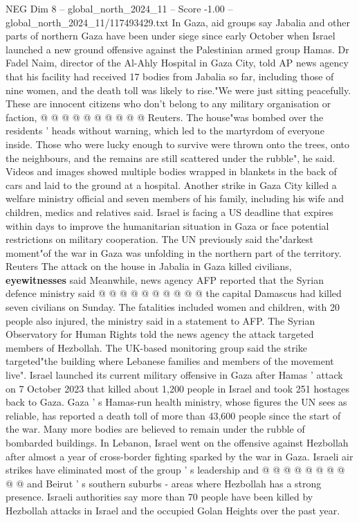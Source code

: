 \begin{textsample}{NEG Dim 8 – global\_north\_2024\_11 – Score -1.00 – global\_north\_2024\_11/117493429.txt}
In Gaza, aid groups say Jabalia and other parts of northern Gaza have been under siege since early October when Israel launched a new ground offensive against the Palestinian armed group Hamas.
Dr Fadel Naim, director of the Al-Ahly Hospital in Gaza City, told AP news agency that his facility had received 17 bodies from Jabalia so far, including those of nine women, and the death toll was likely to rise."We were just sitting peacefully.
These are innocent citizens who don't belong to any military organisation or faction, @ @ @ @ @ @ @ @ @ @ Reuters.
The house"was bombed over the residents ' heads without warning, which led to the martyrdom of everyone inside.
Those who were lucky enough to survive were thrown onto the trees, onto the neighbours, and the remains are still scattered under the rubble", he said.
Videos and images showed multiple bodies wrapped in blankets in the back of cars and laid to the ground at a hospital.
Another strike in Gaza City killed a welfare ministry official and seven members of his family, including his wife and children, medics and relatives said.
Israel is facing a US deadline that expires within days to improve the humanitarian situation in Gaza or face potential restrictions on military cooperation.
The UN previously said the"darkest moment"of the war in Gaza was unfolding in the northern part of the territory.
Reuters The attack on the house in Jabalia in Gaza killed civilians, \textbf{eyewitnesses} said Meanwhile, news agency AFP reported that the Syrian defence ministry said @ @ @ @ @ @ @ @ @ @ the capital Damascus had killed seven civilians on Sunday.
The fatalities included women and children, with 20 people also injured, the ministry said in a statement to AFP.
The Syrian Observatory for Human Rights told the news agency the attack targeted members of Hezbollah.
The UK-based monitoring group said the strike targeted"the building where Lebanese families and members of the movement live".
Israel launched its current military offensive in Gaza after Hamas ' attack on 7 October 2023 that killed about 1,200 people in Israel and took 251 hostages back to Gaza.
Gaza ' s Hamas-run health ministry, whose figures the UN sees as reliable, has reported a death toll of more than 43,600 people since the start of the war.
Many more bodies are believed to remain under the rubble of bombarded buildings.
In Lebanon, Israel went on the offensive against Hezbollah after almost a year of cross-border fighting sparked by the war in Gaza.
Israeli air strikes have eliminated most of the group ' s leadership and @ @ @ @ @ @ @ @ @ @ and Beirut ' s southern suburbs - areas where Hezbollah has a strong presence.
Israeli authorities say more than 70 people have been killed by Hezbollah attacks in Israel and the occupied Golan Heights over the past year.

\end{textsample}
